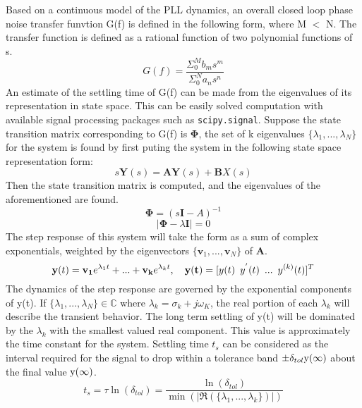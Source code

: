 	Based on a continuous model of the PLL dynamics, an overall closed loop phase noise transfer funvtion G(f) is defined in the following form, where M $<$ N. The transfer function is defined as a rational function of two polynomial functions of s. 
	\begin{equation}
	G(f) = \frac{\Sigma_0^M b_ms^m}{\Sigma_0^N a_ns^n}
	\end{equation}
	An estimate of the settling time of G(f) can be made from the eigenvalues of its  representation in state space. This can be easily solved computation with available signal processing packages such as \texttt{scipy.signal}. Suppose the state transition matrix corresponding to G(f) is $\mathbf{\Phi}$, the set of k eigenvalues $\{\lambda_1, ... , \lambda_{N}\}$ for the system is found by first puting the system in the following state space representation form:
	\begin{equation}
	s\mathbf{Y}(s) = \mathbf{AY}(s) +\mathbf{B}X(s)
	\end{equation}
	Then the state transition matrix is computed, and the eigenvalues of the aforementioned are found.
	\begin{equation}
	\mathbf{\Phi} = (s\mathbf{I}-A)^{-1}
	\end{equation}
	\begin{equation}
	|\mathbf{\Phi} - \lambda \mathbf{I}| = 0
	\end{equation}
	The step response of this system will take the form as a sum of complex exponentials, weighted by the eigenvectors $\{\mathbf{v}_1, ... , \mathbf{v}_N\}$ of $\mathbf{A}$.
	\begin{equation}
	\mathbf{y}(t) = \mathbf{v_1}e^{\lambda_1t} + ... + \mathbf{v_k}e^{\lambda_kt}, \hspace{1em} \mathbf{y(t)} = [ y(t) \hspace{0.5em}y^{'}(t)\hspace{0.5em} ...\hspace{0.5em} y^{(k)}(t)]^T
	\end{equation}
	The dynamics of the step response are governed by the exponential components of y(t). If  $\{\lambda_1, ... , \lambda_N\} \in \mathds{C}$ where $\lambda_k=\sigma_k+j\omega_K$, the real portion of each $\lambda_k$ will describe the transient behavior. The long term settling of y(t) will be dominated by the $\lambda_k$ with the smallest valued real component. This value is approximately the time constant for the system. Settling time $t_s$ can be considered as the interval required for the signal to drop within a tolerance band $\pm \delta_{tol} \textnormal{y}(\infty)$ about the final value $\textnormal{y}(\infty)$. 
	\begin{equation}
	t_s = \tau\ln(\delta_{tol}) = \frac{\ln(\delta_{tol})}{\min(|\Re(\{\lambda_1, ... , \lambda_k\})|)}
	\end{equation}

